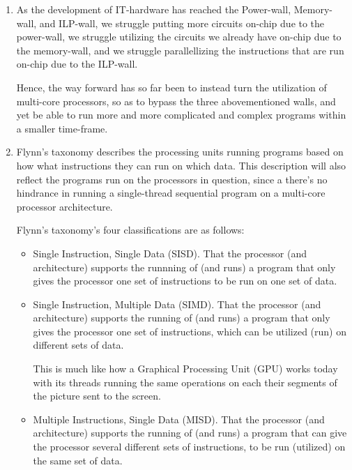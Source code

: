 \documentclass[fontsize=11pt, paper=a4, titlepage]{article}
\begin{document}
\begin{enumerate}
\renewcommand{\theenumi}{\Alph{enumi}}

    \item As the development of IT-hardware has reached the Power-wall,
Memory-wall, and ILP-wall, we struggle putting more circuits on-chip due to
the power-wall, we struggle utilizing the circuits we already have on-chip
due to the memory-wall, and we struggle parallellizing the instructions that
are run on-chip due to the ILP-wall.

Hence, the way forward has so far been to instead turn the utilization of
multi-core processors, so as to bypass the three abovementioned walls, and
yet be able to run more and more complicated and complex programs within a
smaller time-frame.

    \item Flynn's taxonomy describes the processing units running programs
based on how what instructions they can run on which data. This description
will also reflect the programs run on the processors in question, since a
there's no hindrance in running a single-thread sequential program on a
multi-core processor architecture.

Flynn's taxonomy's four classifications are as follows:

    \begin{itemize}

        \item Single Instruction, Single Data (SISD). That the processor (and
architecture) supports the runnning of (and runs) a program that only gives the
processor one set of instructions to be run on one set of data.

        \item Single Instruction, Multiple Data (SIMD). That the processor (and
architecture) supports the running of (and runs) a program that only gives the
processor one set of instructions, which can be utilized (run) on  different
sets of data.

This is much like how a Graphical Processing Unit (GPU) works today with its
threads running the same operations on each their segments of the picture
sent to the screen.

        \item Multiple Instructions, Single Data (MISD). That the processor (and
architecture) supports the running of (and runs) a program that can give the
processor several different sets of instructions, to be run (utilized) on the
same set of data.


\end{itemize}
\end{enumerate}
\end{document}
